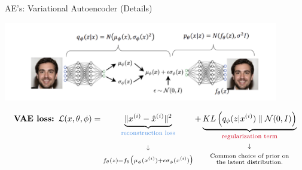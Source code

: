\documentclass[serif, aspectratio=169]{beamer}
\begin{document}
\begin{frame}{AE's: Variational Autoencoder (Details)}
    \begin{center}
        \includegraphics[width=0.9\textwidth]{pic/VAE details1.png}
    \end{center}
    \scriptsize
    \begin{equation*}
        \textbf{VAE loss: } \mathcal{L}(x, \theta, \phi) = 
        \underbrace{
            \| x^{(i)} - \hat{x}^{(i)} \|^2
        }_{\substack{
            \text{\textcolor[rgb]{0.29,0.56,0.89}{reconstruction loss}} \\ 
            \\
            \\
            \downarrow\\
            \\
            f_{\theta}(z) = f_{\theta} \big( \mu_{\phi}(x^{(i)}) + \epsilon \sigma_{\phi}(x^{(i)}) \big)
        }}
        + 
        \underbrace{
            KL\left( q_{\phi}(z | x^{(i)}) \parallel \mathcal{N}(0, I) \right)
        }_{\substack{
            \text{\textcolor[rgb]{0.82,0.01,0.11}{regularization term}} \\ 
            \\
            \downarrow\\
            \\
            \text{Common choice of prior on} \\
            \text{the latent distribution.}
        }}
    \end{equation*}

\end{frame}
\end{document}
